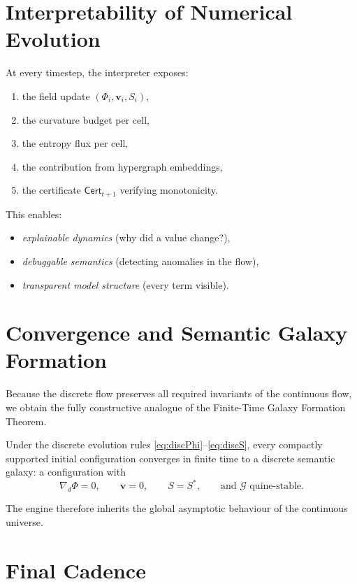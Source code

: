 \section{Interpretability of Numerical Evolution}

At every timestep, the interpreter exposes:

\begin{enumerate}
\item the field update $(\Phi_i,\mathbf{v}_i,S_i)$,
\item the curvature budget per cell,
\item the entropy flux per cell,
\item the contribution from hypergraph embeddings,
\item the certificate $\mathsf{Cert}_{t+1}$ verifying monotonicity.
\end{enumerate}

This enables:
\begin{itemize}
\item \emph{explainable dynamics} (why did a value change?),
\item \emph{debuggable semantics} (detecting anomalies in the flow),
\item \emph{transparent model structure} (every term visible).
\end{itemize}

\section{Convergence and Semantic Galaxy Formation}

Because the discrete flow preserves all required invariants of the
continuous flow, we obtain the fully constructive analogue of the
Finite-Time Galaxy Formation Theorem.

\begin{theorem}
Under the discrete evolution rules
\eqref{eq:discPhi}--\eqref{eq:discS}, every compactly supported
initial configuration converges in finite time to a discrete semantic
galaxy: a configuration with
\[
  \nabla_d \Phi = 0,\qquad
  \mathbf{v}=0,\qquad
  S = S^\ast,\qquad
  \text{and }\mathcal{G}\text{ quine-stable}.
\]
\end{theorem}

The engine therefore inherits the global asymptotic behaviour of the
continuous universe.

\section{Final Cadence}

